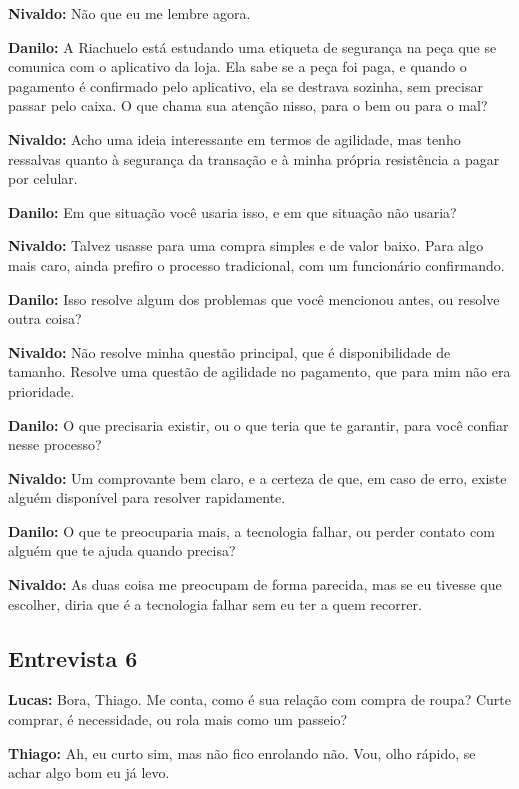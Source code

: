 \textbf{Nivaldo:} Não que eu me lembre agora.

\textbf{Danilo:} A Riachuelo está estudando uma etiqueta de segurança na peça que se comunica com o aplicativo da loja. Ela sabe se a peça foi paga, e quando o pagamento é confirmado pelo aplicativo, ela se destrava sozinha, sem precisar passar pelo caixa. O que chama sua atenção nisso, para o bem ou para o mal?

\textbf{Nivaldo:} Acho uma ideia interessante em termos de agilidade, mas tenho ressalvas quanto à segurança da transação e à minha própria resistência a pagar por celular.

\textbf{Danilo:} Em que situação você usaria isso, e em que situação não usaria?

\textbf{Nivaldo:} Talvez usasse para uma compra simples e de valor baixo. Para algo mais caro, ainda prefiro o processo tradicional, com um funcionário confirmando.

\textbf{Danilo:} Isso resolve algum dos problemas que você mencionou antes, ou resolve outra coisa?

\textbf{Nivaldo:} Não resolve minha questão principal, que é disponibilidade de tamanho. Resolve uma questão de agilidade no pagamento, que para mim não era prioridade.

\textbf{Danilo:} O que precisaria existir, ou o que teria que te garantir, para você confiar nesse processo?

\textbf{Nivaldo:} Um comprovante bem claro, e a certeza de que, em caso de erro, existe alguém disponível para resolver rapidamente.

\textbf{Danilo:} O que te preocuparia mais, a tecnologia falhar, ou perder contato com alguém que te ajuda quando precisa?

\textbf{Nivaldo:} As duas coisa me preocupam de forma parecida, mas se eu tivesse que escolher, diria que é a tecnologia falhar sem eu ter a quem recorrer.


\subsection*{Entrevista 6}

\textbf{Lucas:} Bora, Thiago. Me conta, como é sua relação com compra de roupa? Curte comprar, é necessidade, ou rola mais como um passeio?

\textbf{Thiago:} Ah, eu curto sim, mas não fico enrolando não. Vou, olho rápido, se achar algo bom eu já levo.

